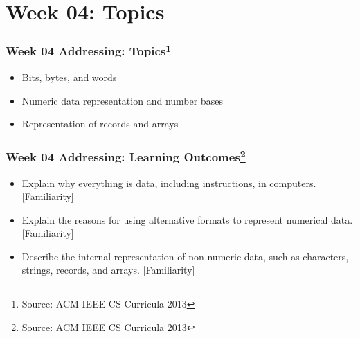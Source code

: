 
\section{Week 04: Topics}
\begin{frame}[fragile]
\frametitle{Week 04 Addressing:
Topics\footnote{Source: ACM IEEE CS Curricula 2013}}

\begin{itemize}
\item Bits, bytes, and words
\item Numeric data representation and number bases
\item Representation of records and arrays
\end{itemize}
\end{frame}


\begin{frame}[fragile]
\frametitle{Week 04 Addressing:
Learning Outcomes\footnote{Source: ACM IEEE CS Curricula 2013}}
\begin{itemize}
\item Explain why everything is data, including instructions, in computers. [Familiarity]
\item Explain the reasons for using alternative formats to represent numerical data. [Familiarity]
\item Describe the internal representation of non-numeric data, such as characters, strings, records, and arrays.  [Familiarity]
\end{itemize}

\end{frame}

